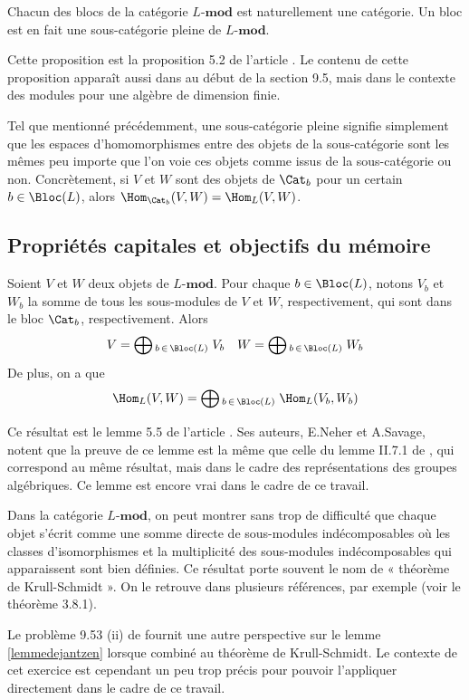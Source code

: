 \begin{Prop} Chacun des blocs de la catégorie $L$-$\mathbf{mod}$ est naturellement une catégorie. Un bloc est en fait une sous-catégorie pleine de $L$-$\mathbf{mod}$.
\end{Prop}

Cette proposition est la proposition 5.2 de l'article \cite{NSext}. Le contenu de cette proposition apparaît aussi dans \cite{Etingof} au début de la section 9.5, mais dans le contexte des modules pour une algèbre de dimension finie.

Tel que mentionné précédemment, une sous-catégorie pleine signifie simplement que les espaces d'homomorphismes entre des objets de la sous-catégorie sont les mêmes peu importe que l'on voie ces objets comme issus de la sous-catégorie ou non. Concrètement, si $V$ et $W$ sont des objets de $\Cat_b$ pour un certain $b \in \Bloc(L)$, alors $\Hom_{\Cat_b}(V,W) = \Hom_L(V,W)$.



%
\subsection{Propriétés capitales et objectifs du mémoire}

\begin{Lem} \label{lemmedejantzen} Soient $V$ et $W$ deux objets de $L$-$\mathbf{mod}$. Pour chaque $b \in \Bloc(L)$, notons $V_b$ et $W_b$ la somme de tous les sous-modules de $V$ et $W$, respectivement, qui sont dans le bloc $\Cat_b$, respectivement. Alors 
\begin{align*}
V = \bigoplus\textstyle{_{b \, \in \, \Bloc(L)}} \; V_b && W = \bigoplus\textstyle{_{b \, \in \, \Bloc(L)}} \; W_b
\end{align*}
De plus, on a que 
$$ \Hom_L(V,W) = \bigoplus\textstyle{_{b \, \in \, \Bloc(L)}} \; \Hom_L(V_b,W_b) $$
\end{Lem}

Ce résultat est le lemme 5.5 de l'article \cite{NSext}. Ses auteurs, E.Neher et A.Savage, notent que la preuve de ce lemme est la même que celle du lemme II.7.1 de \cite{Jantzen}, qui correspond au même résultat, mais dans le cadre des représentations des groupes algébriques. Ce lemme est encore vrai dans le cadre de ce travail.

\begin{Rem} Dans la catégorie $L$-$\mathbf{mod}$, on peut montrer sans trop de difficulté que chaque objet s'écrit comme une somme directe de sous-modules indécomposables où les classes d'isomorphismes et la multiplicité des sous-modules indécomposables qui apparaissent sont bien définies. Ce résultat porte souvent le nom de « théorème de Krull-Schmidt ». On le retrouve dans plusieurs références, par exemple \cite{Etingof} (voir le théorème 3.8.1).

Le problème 9.53 (ii) de \cite{Etingof} fournit une autre perspective sur le lemme \ref{lemmedejantzen} lorsque combiné au théorème de Krull-Schmidt. Le contexte de cet exercice est cependant un peu trop précis pour pouvoir l'appliquer directement dans le cadre de ce travail.
\end{Rem}

